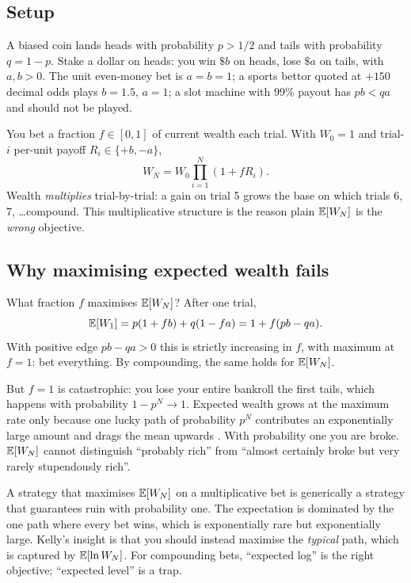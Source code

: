 \subsection{Setup}

A biased coin lands heads with probability $p > 1/2$ and tails
with probability $q = 1 - p$. Stake a dollar on heads: you win
$\$b$ on heads, lose $\$a$ on tails, with $a, b > 0$. The unit
even-money bet is $a = b = 1$; a sports bettor quoted at $+150$
decimal odds plays $b = 1.5$, $a = 1$; a slot machine with $99\%$
payout has $pb < qa$ and should not be played.

You bet a fraction $f \in [0, 1]$ of current wealth each trial.
With $W_0 = 1$ and trial-$i$ per-unit payoff $R_i \in \{+b, -a\}$,
\begin{equation}
  W_N = W_0 \prod_{i=1}^{N} (1 + f R_i).
\end{equation}
Wealth \emph{multiplies} trial-by-trial: a gain on trial 5 grows
the base on which trials 6, 7, \ldots compound. This multiplicative
structure is the reason plain $\mathbb{E}[W_N]$ is the \emph{wrong}
objective.

\subsection{Why maximising expected wealth fails}
\label{sec:kelly_expected_wealth_trap}

What fraction $f$ maximises $\mathbb{E}[W_N]$? After one trial,
\begin{equation}
  \mathbb{E}[W_1] = p(1 + fb) + q(1 - fa) = 1 + f(pb - qa).
\end{equation}
With positive edge $pb - qa > 0$ this is strictly increasing in
$f$, with maximum at $f = 1$: bet everything. By compounding, the
same holds for $\mathbb{E}[W_N]$.

But $f = 1$ is catastrophic: you lose your entire bankroll the
first tails, which happens with probability $1 - p^N \to 1$.
Expected wealth grows at the maximum rate only because one lucky
path of probability $p^N$ contributes an exponentially large
amount and drags the mean upwards \citeThorp. With probability one
you are broke. $\mathbb{E}[W_N]$ cannot distinguish ``probably rich'' from
``almost certainly broke but very rarely stupendously rich''.

\begin{pitfallbox}
A strategy that maximises $\mathbb{E}[W_N]$ on a multiplicative bet is
generically a strategy that guarantees ruin with probability one.
The expectation is dominated by the one path where every bet wins,
which is exponentially rare but exponentially large. Kelly's
insight is that you should instead maximise the \emph{typical}
path, which is captured by $\mathbb{E}[\ln W_N]$. For compounding bets,
``expected log'' is the right objective; ``expected level'' is a
trap.
\end{pitfallbox}

